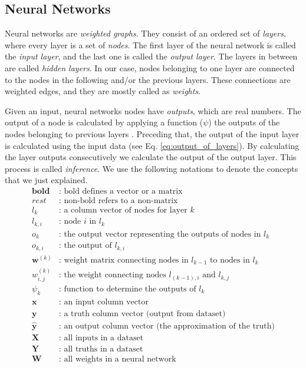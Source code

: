 \subsection{Neural Networks}
Neural networks are \textit{weighted graphs}. They consist of an ordered set of \textit{layers}, where every layer is a set of \textit{nodes}. The first layer of the neural network is called the \textit{input layer}, and the last one is called the \textit{output layer}. The layers in between are called \textit{hidden layers}. In our case, nodes belonging to one layer are connected to the nodes in the following and/or the previous layers. These connections are weighted edges, and they are mostly called as \textit{weights}. 

Given an input, neural networks nodes have \textit{outputs}, which are real numbers. The output of a node is calculated by applying a function ($\psi$) the outputs of the nodes belonging to previous layers . Preceding that, the output of the input layer is calculated using the input data (see Eq. \ref{eq:output_of_layers}).  By calculating the layer outputs consecutively we calculate the output of the output layer. This process is called \textit{inference}. We use the following notations to denote the concepts that we just explained.
\begin{equation}
\label{eq:variable_definitions}
\begin{split}
\mathbf{bold} & \text{: bold defines a vector or a matrix} \\
rest & \text{: non-bold refers to a non-matrix} \\
l_k & \text{: a column vector of nodes for layer $k$}\\
l_{k,i}  & \text{: node $i$ in $l_k$}\\
o_{k}  & \text{: the output vector representing the outputs of nodes in $l_{k}$}\\
o_{k,i}  & \text{: the output of $l_{k,i}$}\\
\mathbf{w}^{(k)}  & \text{: weight matrix connecting nodes in $l_{k-1}$ to nodes in $l_{k}$} \\
w^{(k)}_{i,j}  & \text{: the weight connecting nodes $l_{(k-1),i}$ and $l_{k,j}$} \\
\psi_k & \text{: function to determine the outputs of $l_k$}\\
\mathbf{x} & \text{: an input column vector } \\
\mathbf{y} & \text{: a truth column vector (output from dataset)} \\
\mathbf{\hat y} & \text{: an output column vector (the approximation of the truth)}  \\
\mathbf{X} & \text{: all inputs in a dataset } \\
\mathbf{Y} & \text{: all truths in a dataset } \\
\mathbf{W} & \text{: all weights in a neural network}
\end{split}
\end{equation}
